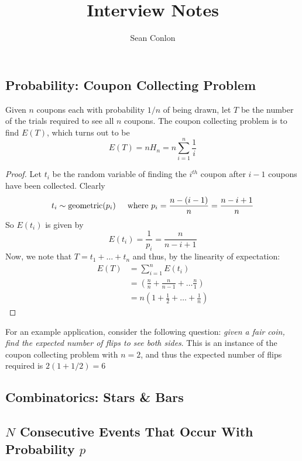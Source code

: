 \documentclass{article}
\title{Interview Notes}
\author{Sean Conlon}
\begin{document}
\maketitle

\newpage
\subsection*{Probability: Coupon Collecting Problem}
Given $n$ coupons each with probability $1/n$ of being drawn, let $T$ be the number of the trials required to see all $n$ coupons. The coupon collecting problem is to find $E(T)$, which turns out to be 
$$E(T) = n H_n = n \sum_{i=1}^{n}\frac{1}{i}$$
\begin{proof}
    Let $t_i$ be the random variable of finding the $i^{th}$ coupon after $i-1$ coupons have been collected. Clearly
    $$t_i \sim \text{geometric}(p_i) \hspace{5mm} \text{where } p_i = \frac{n-(i-1)}{n} = \frac{n-i+1}{n}$$
    So $E(t_i)$ is given by 
    $$E(t_i) = \frac{1}{p_i} = \frac{n}{n-i+1}$$
    Now, we note that $T = t_1 + \dots + t_n$ and thus, by the linearity of expectation: 
    \begin{align*}
        E(T) &= \sum_{i=1}^{n}E(t_i) \\
        &= \left(\frac{n}{n} + \frac{n}{n-1} + \dots \frac{n}{1} \right) \\
        &= n\left(1 + \frac{1}{2} + \dots + \frac{1}{n} \right)
    \end{align*}
\end{proof}
For an example application, consider the following question: \textit{given a fair coin, find the expected number of flips to see both sides}. This is an instance of the coupon collecting problem with $n=2$, and thus the expected number of flips required is $2(1+1/2) = 6$


\subsection*{Combinatorics: Stars \& Bars}


\newpage
\subsection*{$N$ Consecutive Events That Occur With Probability $p$}
\end{document}
